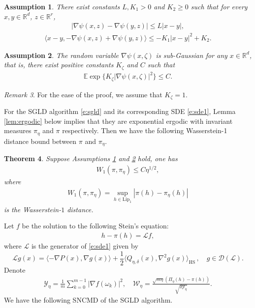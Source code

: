 \documentclass[12pt]{amsart}
\newtheorem{theorem}{Theorem}[section]
\newtheorem{assumption}[theorem]{Assumption}
\theoremstyle{definition}
\theoremstyle{remark}
\newtheorem{remark}[theorem]{Remark}
\numberwithin{equation}{section}
\newcommand{\Y}{\mathcal{Y}}
\newcommand{\W}{\mathcal{W}}           %
\newcommand{\E}{\mathbb{E}}            %
\newcommand{\Ll}{\langle}
\newcommand{\Rr}{\rangle}
\newcommand{\R}{\mathbb{R}}\newcommand{\RR}{\mathbb{R}}
\begin{document}
\begin{assumption}\label{assu1}
	There exist constants $L, K_1 >0$ and $K_2 \ge 0$ such that for every $x,y\in \R^d$, $z\in\R^r$, 
	\begin{eqnarray}\label{e:lip}
		|\nabla\psi(x,z)-\nabla\psi(y,z)|\le L|x-y|,
	\end{eqnarray}
	\begin{eqnarray}\label{e:dissi}
		\Ll x-y,-\nabla \psi(x,z)+\nabla \psi(y,z)\Rr\le -K_1|x-y|^2+K_2.
	\end{eqnarray}
\end{assumption}



\begin{assumption}\label{assu2}
	The random variable $\nabla\psi(x,\zeta)$ is sub-Gaussian for any $x\in\R^d$, that is, there exist positive constants $K_\zeta$ and $C$ such that 
	\begin{eqnarray*}
		\E\exp\{K_\zeta|\nabla\psi(x,\zeta)|^2\} \le C.
	\end{eqnarray*} 
\end{assumption}
\begin{remark}
For the ease of the proof, we assume that $K_\zeta=1$.
\end{remark}

For the SGLD algorithm \eqref{e:sgld} and its corresponding SDE \eqref{e:sde1}, Lemma \ref{lem:ergodic} below implies that they are exponential ergodic with invariant measures $\pi_\eta$ and $\pi$ respectively. Then we have the following Wasserstein-1 distance bound between $\pi$ and $\pi_\eta$.  
\begin{theorem}\label{lem: pipieta}
Suppose Assumptions \ref{assu1} and \ref{assu2} hold, one has
\begin{eqnarray}
W_1(\pi,\pi_\eta)\le C\eta^{1/2},
\end{eqnarray}
where
\begin{eqnarray*}
	W_1(\pi,\pi_\eta)=\sup_{h\in\mathrm{Lip_1}}|\pi(h)-\pi_\eta(h)|
\end{eqnarray*}
is the Wasserstein-$1$ distance.
\end{theorem}

Let $f$ be the solution to the following Stein's equation:
\begin{align}\label{e:stein}
	h-\pi(h)=\mathcal{L}f,
\end{align}
where $\mathcal L$ is the generator of \eqref{e:sde1} given by 
\begin{equation}\label{e:generator}
	\mathcal L g(x)=\Ll -\nabla P(x), \nabla g(x) \Rr+\frac1 2\Ll Q_{\eta,\delta}(x),\nabla^2g(x) \Rr_{\text{HS}}\,, %
	\quad g\in\mathcal D(\mathcal L).
\end{equation}
Denote
\begin{align*}
	\Y_\eta=\frac{1}{m}\sum_{k=0}^{m-1} |\nabla f(\omega_k)|^2,\quad 	\W_\eta= \frac{\sqrt{m\eta}(\Pi_\eta(h)- \pi(h))}{\sqrt{\delta	\Y_\eta}}.
\end{align*}
We have the following SNCMD of the SGLD algorithm.
\end{document}
